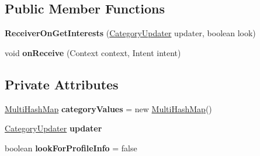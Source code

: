 \subsection*{Public Member Functions}
\begin{DoxyCompactItemize}
\item 
{\bfseries Receiver\+On\+Get\+Interests} (\hyperlink{interfacecom_1_1example_1_1sebastian_1_1tindertp_1_1Interfaces_1_1CategoryUpdater}{Category\+Updater} updater, boolean look)\hypertarget{classcom_1_1example_1_1sebastian_1_1tindertp_1_1services_1_1ReceiverOnGetInterests_a1c6693804f8ebfe6e3bb2f0c51ab4de3}{}\label{classcom_1_1example_1_1sebastian_1_1tindertp_1_1services_1_1ReceiverOnGetInterests_a1c6693804f8ebfe6e3bb2f0c51ab4de3}

\item 
void {\bfseries on\+Receive} (Context context, Intent intent)\hypertarget{classcom_1_1example_1_1sebastian_1_1tindertp_1_1services_1_1ReceiverOnGetInterests_a2617638cb16a02c326c19216f5ddac71}{}\label{classcom_1_1example_1_1sebastian_1_1tindertp_1_1services_1_1ReceiverOnGetInterests_a2617638cb16a02c326c19216f5ddac71}

\end{DoxyCompactItemize}
\subsection*{Private Attributes}
\begin{DoxyCompactItemize}
\item 
\hyperlink{classcom_1_1example_1_1sebastian_1_1tindertp_1_1commonTools_1_1MultiHashMap}{Multi\+Hash\+Map} {\bfseries category\+Values} = new \hyperlink{classcom_1_1example_1_1sebastian_1_1tindertp_1_1commonTools_1_1MultiHashMap}{Multi\+Hash\+Map}()\hypertarget{classcom_1_1example_1_1sebastian_1_1tindertp_1_1services_1_1ReceiverOnGetInterests_a8c47e83a2fbb6717d366a23347f856fe}{}\label{classcom_1_1example_1_1sebastian_1_1tindertp_1_1services_1_1ReceiverOnGetInterests_a8c47e83a2fbb6717d366a23347f856fe}

\item 
\hyperlink{interfacecom_1_1example_1_1sebastian_1_1tindertp_1_1Interfaces_1_1CategoryUpdater}{Category\+Updater} {\bfseries updater}\hypertarget{classcom_1_1example_1_1sebastian_1_1tindertp_1_1services_1_1ReceiverOnGetInterests_ab0981cfbf9c8c630e913828c5f3e5eae}{}\label{classcom_1_1example_1_1sebastian_1_1tindertp_1_1services_1_1ReceiverOnGetInterests_ab0981cfbf9c8c630e913828c5f3e5eae}

\item 
boolean {\bfseries look\+For\+Profile\+Info} = false\hypertarget{classcom_1_1example_1_1sebastian_1_1tindertp_1_1services_1_1ReceiverOnGetInterests_a806d0ec214b020aff41a8f2aa4f93c17}{}\label{classcom_1_1example_1_1sebastian_1_1tindertp_1_1services_1_1ReceiverOnGetInterests_a806d0ec214b020aff41a8f2aa4f93c17}

\end{DoxyCompactItemize}
